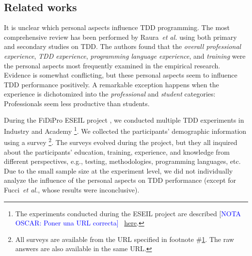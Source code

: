 \documentclass[10pt,conference]{IEEEtran}\usepackage[]{graphicx}\usepackage[table,xcdraw]{xcolor}
\newcommand{\odnote}[1]{[\textcolor{blue}{NOTA OSCAR: #1]~}}
\newcommand{\etal}[0]{~\textit{et al.}}
\begin{document}
\subsection{Related works}

It is unclear which personal aspects influence TDD programming. The most comprehensive review has been performed by Raura\etal{} \cite{} using both primary and secondary studies on TDD. The authors found that the \textit{overall professional experience}, \textit{TDD experience}, \textit{programming language experience}, and \textit{training} were the personal aspects most frequently examined in the empirical research. Evidence is somewhat conflicting, but these personal aspects seem to influence TDD performance positively. A remarkable exception happens when the experience is dichotomized into the \textit{professional} and \textit{student} categories: Professionals seem less productive than students.

During the FiDiPro ESEIL project \cite{juristo2016experiences}, we conducted multiple TDD experiments in Industry and Academy%
\footnote{The experiments conducted during the ESEIL project are described \odnote{Poner una URL correcta} \href{https://docs.google.com/forms/d/1-UGx8xDZ6EWyvAabIvIRWnx7UDIQj1-Ts5w0wBS3UgA}{here}.\label{foot:eseil}}.
We collected the participants' demographic information using a survey%
\footnote{All surveys are available from the URL specified in footnote \#\ref{foot:eseil}. The raw answers are also available in the same URL.}. The surveys evolved during the project, but they all inquired about the participants' education, training, experience, and knowledge from different perspectives, e.g., testing, methodologies, programming languages, etc. Due to the small sample size at the experiment level, we did not individually analyze the influence of the personal aspects on TDD performance (except for Fucci\etal \cite{fucci2015towards}, whose results were inconclusive). 
\end{document}
